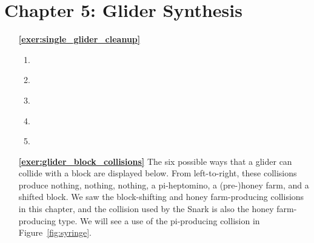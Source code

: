 \hypertarget{solutions_glider_synthesis}{}\label{solutions_glider_synthesis}
\section*{Chapter 5: Glider Synthesis}
\renewcommand{\chapterfolder}{glider_synthesis/}

\begin{multicols}{2}
	\begin{itemize}[leftmargin=0em]
		\item[\bf\color{ocre}\sffamily\ref{exer:single_glider_cleanup}]
		\begin{enumerate}[leftmargin=1.5em,label=\bf\color{ocre}(\alph*)]
			\item {} \\
			
			\item {} \\
			
			\item {} \\
			
			\item {} \\
			
			\item {} \\
		\end{enumerate}
		
		
		\item[\bf\color{ocre}\sffamily\ref{exer:glider_block_collisions}] The six possible ways that a glider can collide with a block are displayed below. From left-to-right, these collisions produce nothing, nothing, nothing, a pi-heptomino, a (pre-)honey farm, and a shifted block. We saw the block-shifting and honey farm-producing collisions in this chapter, and the collision used by the Snark is also the honey farm-producing type. We will see a use of the pi-producing collision in Figure~\ref{fig:syringe}.
		\begin{center}
		\end{center}
		

\end{itemize}
\end{multicols}
